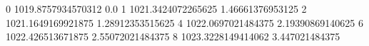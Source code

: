 0 1019.8757934570312 0.0
1 1021.3424072265625 1.46661376953125
2 1021.1649169921875 1.28912353515625
4 1022.0697021484375 2.19390869140625
6 1022.426513671875 2.55072021484375
8 1023.3228149414062 3.447021484375
